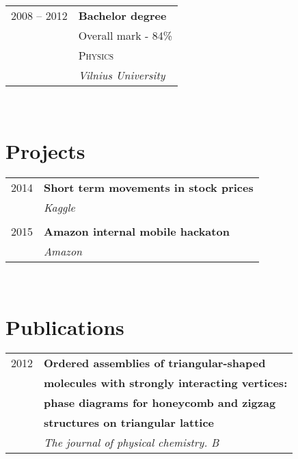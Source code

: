 \documentclass[10pt]{article} %
\begin{document}
{\begin{minipage}[t]{0.44\textwidth}
\begin{tabular}{rl}
2008 -- 2012 & \textbf{Bachelor degree}\\
& \small Overall mark - 84\% \\
& \textsc{Physics} \\ 
& \textit{Vilnius University} 
	

\end{tabular}\\[10pt]


\section{Projects} 

\begin{tabular}{rl}
2014	 & \textbf{Short term movements in stock prices}\\
& \textit{Kaggle}\\
&\\
2015     & \textbf{Amazon internal mobile hackaton}\\
& \textit{Amazon}

\end{tabular}\\[10pt]


\section{Publications} 

\begin{tabular}{rl}
2012	 & \textbf{Ordered assemblies of triangular-shaped} \\
         & \textbf{molecules with strongly interacting vertices:}\\
         & \textbf{phase diagrams for honeycomb and zigzag}\\
         & \textbf{structures on triangular lattice} \\
& \textit{The journal of physical chemistry. B}
\end{tabular}\\[10pt]


\end{minipage}}
\end{document}
